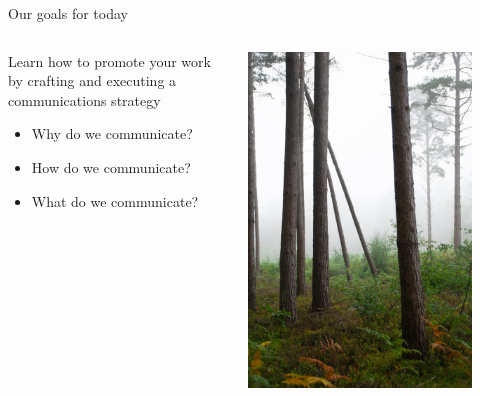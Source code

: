 \begin{frame}{Our goals for today}
    
    \begin{columns}[c]
        \begin{column}{.45\textwidth}
        
        Learn how to promote your work by crafting and executing a communications strategy
        
            \begin{itemize}
                \item Why do we communicate?
                \item How do we communicate?
                \item What do we communicate?
            \end{itemize}
        \end{column}
        
        \begin{column}{.45\textwidth}
            \includegraphics[trim=0cm 1cm 2.5cm 5cm, clip=true,width=0.85\textwidth]{images/harry-shelton-PmwG9GmNyaU-unsplash.jpg}
            
        \end{column}
    \end{columns}
    
\end{frame}

